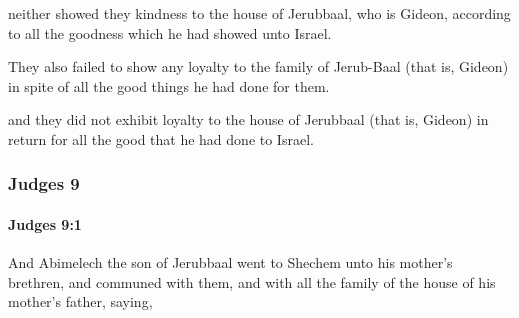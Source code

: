 			\begin{versebox}
					\item[BHS] 
					\item[ASV] neither showed they kindness to the house of Jerubbaal, who is Gideon, according to all the goodness which he had showed unto Israel.
					\item[NIV] They also failed to show any loyalty to the family of Jerub-Baal (that is, Gideon) in spite of all the good things he had done for them.
					\item[NRSV] and they did not exhibit loyalty to the house of Jerubbaal (that is, Gideon) in return for all the good that he had done to Israel.
			\end{versebox}
	\subsubsection{Judges 9} %
		\label{JUDGES-9}

		\paragraph{Judges 9:1} %
			\label{JUDGES-9-1}

			And Abimelech the son of Jerubbaal went to Shechem unto his mother’s brethren, and communed with them, and with all the family of the house of his mother’s father, saying,

